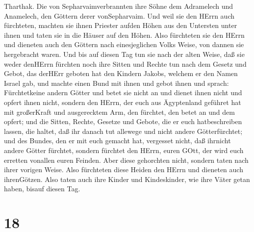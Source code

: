Tharthak. Die von Sepharvaimverbrannten ihre Söhne dem Adramelech und
Anamelech, den Göttern derer vonSepharvaim.  Und weil sie
den HErrn auch fürchteten, machten sie ihnen Priester aufden Höhen aus
den Untersten unter ihnen und taten sie in die Häuser auf den Höhen.
 Also fürchteten sie den HErrn und dieneten auch den
Göttern nach einesjeglichen Volks Weise, von dannen sie hergebracht
waren.  Und bis auf diesen Tag tun sie nach der alten
Weise, daß sie weder denHErrn fürchten noch ihre Sitten und Rechte tun
nach dem Gesetz und Gebot, das derHErr geboten hat den Kindern Jakobs,
welchem er den Namen Israel gab,  und machte einen Bund mit
ihnen und gebot ihnen und sprach: Fürchtetkeine andern Götter und betet
sie nicht an und dienet ihnen nicht und opfert ihnen nicht,
 sondern den HErrn, der euch aus Ägyptenland geführet hat
mit großerKraft und ausgerecktem Arm, den fürchtet, den betet an und dem
opfert;  und die Sitten, Rechte, Gesetze und Gebote, die er
euch hatbeschreiben lassen, die haltet, daß ihr danach tut allewege und
nicht andere Götterfürchtet;  und des Bundes, den er mit
euch gemacht hat, vergesset nicht, daß ihrnicht andere Götter fürchtet,
 sondern fürchtet den HErrn, euren GOtt, der wird euch
erretten vonallen euren Feinden.  Aber diese gehorchten
nicht, sondern taten nach ihrer vorigen Weise.  Also
fürchteten diese Heiden den HErrn und dieneten auch ihrenGötzen. Also
taten auch ihre Kinder und Kindeskinder, wie ihre Väter getan haben,
bisauf diesen Tag.

\hypertarget{section-17}{%
\section{18}\label{section-17}}

